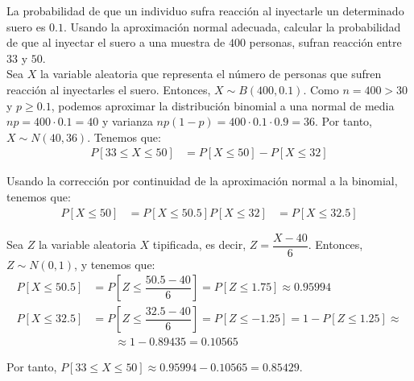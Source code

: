 \begin{ejercicio}
    La probabilidad de que un individuo sufra reacción al inyectarle un determinado suero es $0.1$. Usando la aproximación normal adecuada, calcular la probabilidad de que al inyectar el suero a una muestra de $400$ personas, sufran reacción entre $33$ y $50$.\\

    Sea $X$ la variable aleatoria que representa el número de personas que sufren reacción al inyectarles el suero. Entonces, $X\sim B(400,0.1)$.
    Como $n=400>30$ y $p\geq 0.1$, podemos aproximar la distribución binomial a una normal de media $np = 400\cdot 0.1 = 40$ y varianza $np(1-p) = 400\cdot 0.1\cdot 0.9 = 36$. Por tanto, $X\sim N(40,36)$.
    Tenemos que:
    \begin{align*}
        P[33\leq X\leq 50] &= P\left[X\leq 50\right] - P\left[X\leq 32\right]
    \end{align*}

    Usando la corrección por continuidad de la aproximación normal a la binomial, tenemos que:
    \begin{align*}
        P\left[X\leq 50\right] &= P\left[X\leq 50.5\right]
        P\left[X\leq 32\right] &= P\left[X\leq 32.5\right]
    \end{align*}

    Sea $Z$ la variable aleatoria $X$ tipificada, es decir, $Z = \dfrac{X-40}{6}$. Entonces, $Z\sim N(0,1)$, y tenemos que:
    \begin{align*}
        P\left[X\leq 50.5\right] &= P\left[Z\leq \dfrac{50.5-40}{6}\right] = P\left[Z\leq 1.75\right] \approx 0.95994\\
        P\left[X\leq 32.5\right] &= P\left[Z\leq \dfrac{32.5-40}{6}\right] = P\left[Z\leq -1.25\right]
        = 1-P\left[Z\leq 1.25\right] \approx \\&\qquad \approx 1-0.89435 = 0.10565
    \end{align*}

    Por tanto, $P[33\leq X\leq 50] \approx 0.95994-0.10565 = 0.85429$.
\end{ejercicio}

